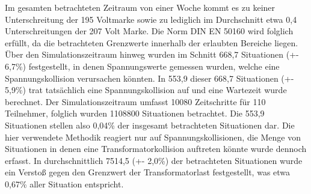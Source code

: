 Im gesamten betrachteten Zeitraum von einer Woche kommt es zu keiner Unterschreitung der 195 Voltmarke sowie zu lediglich im Durchschnitt etwa 0,4 Unterschreitungen der 207 Volt Marke. Die Norm DIN EN 50160 wird folglich erfüllt, da die betrachteten Grenzwerte innerhalb der erlaubten Bereiche liegen.\\
Über den Simulationszeitraum hinweg wurden im Schnitt 668,7 Situationen (+- 6,7\%) festgestellt, in denen Spannungswerte gemessen wurden, welche eine Spannungskollision verursachen könnten. In 553,9 dieser 668,7 Situationen (+- 5,9\%) trat tatsächlich eine Spannungskollision auf und eine Wartezeit wurde berechnet. Der Simulationszeitraum umfasst 10080 Zeitschritte für 110 Teilnehmer, folglich wurden 1108800 Situationen betrachtet. Die 553,9 Situationen stellen also 0,04\% der insgesamt betrachteten Situationen dar. Die hier verwendete Methodik reagiert nur auf Spannungskollisionen, die Menge von Situationen in denen eine Transformatorkollision auftreten könnte wurde dennoch erfasst. In durchschnittlich 7514,5 (+- 2,0\%) der betrachteten Situationen wurde ein Verstoß gegen den Grenzwert der Transformatorlast festgestellt, was etwa 0,67\% aller Situation entspricht.\\
